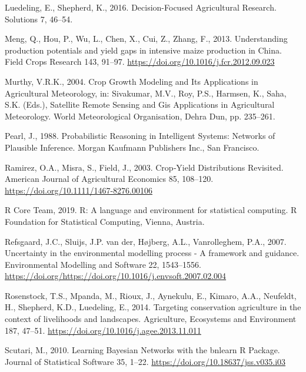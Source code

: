 \documentclass[]{elsarticle} %
\begin{document}
\leavevmode\hypertarget{ref-Luedeling_and_Shepherd_2016}{}%
Luedeling, E., Shepherd, K., 2016. Decision-Focused Agricultural Research. Solutions 7, 46--54.

\leavevmode\hypertarget{ref-Meng_et_al_2013}{}%
Meng, Q., Hou, P., Wu, L., Chen, X., Cui, Z., Zhang, F., 2013. Understanding production potentials and yield gaps in intensive maize production in China. Field Crops Research 143, 91--97. \url{https://doi.org/10.1016/j.fcr.2012.09.023}

\leavevmode\hypertarget{ref-Murthy_2004}{}%
Murthy, V.R.K., 2004. Crop Growth Modeling and Its Applications in Agricultural Meteorology, in: Sivakumar, M.V., Roy, P.S., Harmsen, K., Saha, S.K. (Eds.), Satellite Remote Sensing and Gis Applications in Agricultural Meteorology. World Meteorological Organisation, Dehra Dun, pp. 235--261.

\leavevmode\hypertarget{ref-Pearl_1988}{}%
Pearl, J., 1988. Probabilistic Reasoning in Intelligent Systems: Networks of Plausible Inference. Morgan Kaufmann Publishers Inc., San Francisco.

\leavevmode\hypertarget{ref-Ramirez_et_al_2003}{}%
Ramirez, O.A., Misra, S., Field, J., 2003. Crop‐Yield Distributions Revisited. American Journal of Agricultural Economics 85, 108--120. \url{https://doi.org/10.1111/1467-8276.00106}

\leavevmode\hypertarget{ref-R_Core_Team_2019}{}%
R Core Team, 2019. R: A language and environment for statistical computing. R Foundation for Statistical Computing, Vienna, Austria.

\leavevmode\hypertarget{ref-Refsgaard_et_al_2007}{}%
Refsgaard, J.C., Sluijs, J.P. van der, Højberg, A.L., Vanrolleghem, P.A., 2007. Uncertainty in the environmental modelling process - A framework and guidance. Environmental Modelling and Software 22, 1543--1556. \url{https://doi.org/https://doi.org/10.1016/j.envsoft.2007.02.004}

\leavevmode\hypertarget{ref-Rosenstock_et_al_2014}{}%
Rosenstock, T.S., Mpanda, M., Rioux, J., Aynekulu, E., Kimaro, A.A., Neufeldt, H., Shepherd, K.D., Luedeling, E., 2014. Targeting conservation agriculture in the context of livelihoods and landscapes. Agriculture, Ecosystems and Environment 187, 47--51. \url{https://doi.org/10.1016/j.agee.2013.11.011}

\leavevmode\hypertarget{ref-Scutari_2010}{}%
Scutari, M., 2010. Learning Bayesian Networks with the bnlearn R Package. Journal of Statistical Software 35, 1--22. \url{https://doi.org/10.18637/jss.v035.i03}
\end{document}
